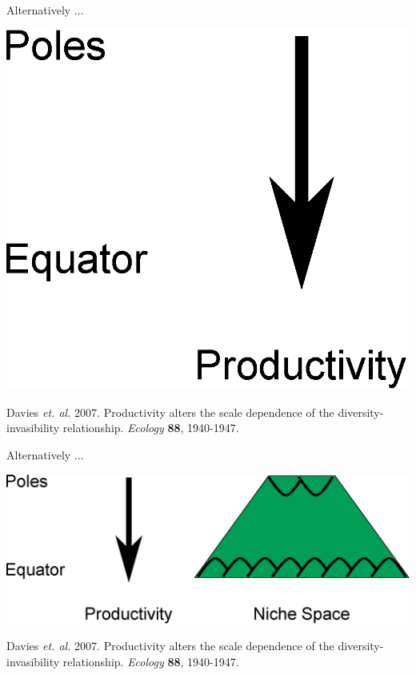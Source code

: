 \documentclass{beamer}
\begin{document}
  \begin{frame}{Alternatively ...}

    \begin{center}
      \includegraphics[width=.8\textwidth]{Figures/latitude_niche_breadth_4.eps}
    \end{center}

    \tiny{Davies \emph{et. al.} 2007. Productivity alters the scale dependence of the diversity-invasibility relationship. \emph{Ecology} \textbf{88}, 1940-1947.}
  \end{frame}


  \begin{frame}{Alternatively ...}

    \begin{center}
      \includegraphics[width=.8\textwidth]{Figures/latitude_niche_breadth_5.eps}
    \end{center}

    \tiny{Davies \emph{et. al.} 2007. Productivity alters the scale dependence of the diversity-invasibility relationship. \emph{Ecology} \textbf{88}, 1940-1947.}
  \end{frame}
\end{document}

